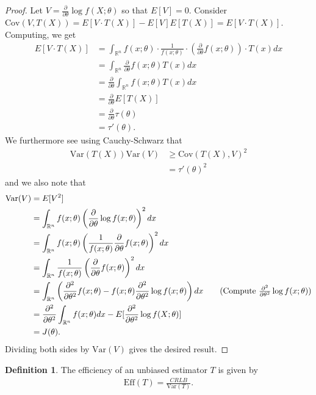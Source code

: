 \documentclass[11pt]{amsart}
\theoremstyle{definition}
\newtheorem{definition}[theorem]{Definition}
\numberwithin{equation}{section}
\begin{document}
\begin{proof}
    Let $V=\frac{\partial}{\partial\theta}\log f(X;\theta)$ so that $E[V]=0$. Consider $\mathrm{Cov}(V,T(X))=E[V\cdot T(X)]-E[V]E[T(X)]=E[V\cdot T(X)]$. Computing, we get
    \begin{align*}
        E[V\cdot T(X)]&=\int_{\mathbb R^n}f(x;\theta)\cdot\frac{1}{f(x;\theta)}\cdot(\frac{\partial}{\partial\theta}f(x;\theta))\cdot T(x)dx\\
        &=\int_{\mathbb R^n}\frac{\partial }{\partial\theta} f(x;\theta )T(x)dx\\
        &=\frac{\partial}{\partial\theta}\int_{\mathbb R^n}f(x;\theta)T(x)dx\\
        &=\frac{\partial}{\partial\theta}E[T(X)]\\
        &=\frac{\partial}{\partial\theta}\tau(\theta)\\
        &=\tau'(\theta).
    \end{align*}
    We furthermore see using Cauchy-Schwarz that
    \begin{align*}
        \mathrm{Var}(T(X))\mathrm{Var}(V)&\ge\mathrm{Cov}(T(X),V)^2\\
        &=\tau'(\theta)^2
    \end{align*}
    and we also note that
    \begin{align*}
        \mathrm{Var}(V)&=E[V^2]\\
        &=\int_{\mathbb R^n}f(x;\theta)\left(\frac{\partial}{\partial\theta}\log f(x;\theta)\right)^2dx\\
        &=\int_{\mathbb R^n}f(x;\theta)\left(\frac{1}{f(x;\theta)}\frac{\partial}{\partial\theta}f(x;\theta)\right)^2dx\\
        &=\int_{\mathbb R^n}\frac{1}{f(x;\theta)}\left(\frac{\partial}{\partial\theta}f(x;\theta)\right)^2dx\\
        &=\int_{\mathbb R^n}\left(\frac{\partial^2}{\partial\theta^2}f(x;\theta)-f(x;\theta)\frac{\partial^2}{\partial\theta^2}\log f(x;\theta)\right)dx\tag{Compute $\frac{\partial^2}{\partial\theta^2}\log f(x;\theta)$}\\
        &=\frac{\partial^2}{\partial\theta^2}\int_{\mathbb R^n}f(x;\theta)dx-E[\frac{\partial^2}{\partial\theta^2}\log f(X;\theta)]\\
        &=J(\theta).
    \end{align*}
    Dividing both sides by $\mathrm{Var}(V)$ gives the desired result.
\end{proof}
\begin{definition}
    The efficiency of an unbiased estimator $T$ is given by
    \begin{align*}
        \mathrm{Eff}(T)=\frac{CRLB}{\mathrm{Var}(T)}.
    \end{align*}
\end{definition}
\end{document}
